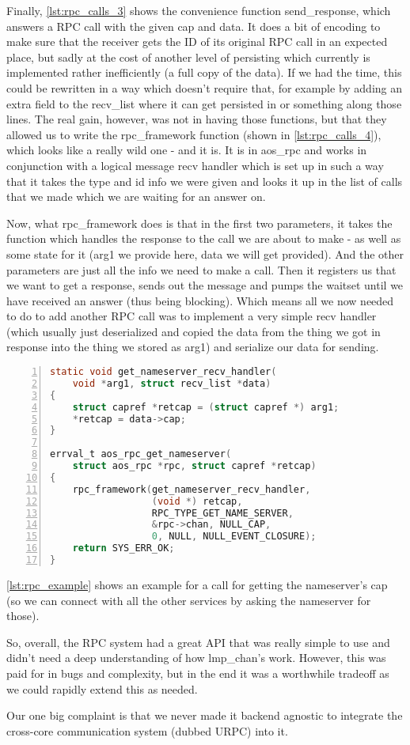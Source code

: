 Finally, \autoref{lst:rpc_calls_3} shows the convenience function 
send\_response, which answers a RPC call with the given cap and data. It does 
a bit of encoding to make sure that the receiver gets the ID of its original 
RPC call in an expected place, but sadly at the cost of another level of 
persisting which currently is implemented rather inefficiently (a full copy 
of the data). If we had the time, this could be rewritten in a way which 
doesn't require that, for example by adding an extra field to the recv\_list 
where it can get persisted in or something along those lines.
The real gain, however, was not in having those functions, but that they 
allowed us to write the rpc\_framework function (shown in 
\autoref{lst:rpc_calls_4}), which looks like a really wild one - and it is. 
It is in aos\_rpc and works in conjunction with a logical message recv handler 
which is set up in such a way that it takes the type and id info we were given 
and looks it up in the list of calls that we made which we are waiting for an 
answer on.
\medskip

Now, what rpc\_framework does is that in the first two parameters, it takes 
the function which handles the response to the call we are about to make - as 
well as some state for it (arg1 we provide here, data we will get provided). 
And the other parameters are just all the info we need to make a call.
Then it registers us that we want to get a response, sends out the message and 
pumps the waitset until we have received an answer (thus being blocking). 
Which means all we now needed to do to add another RPC call was to implement a 
very simple recv handler (which usually just deserialized and copied the data 
from the thing we got in response into the thing we stored as arg1) and 
serialize our data for sending.
\medskip

\begin{lstlisting}[caption={aos\_rpc\_get with helper function}, 
label=lst:rpc_example, numbers=left, stepnumber=1, float, floatplacement=tl, 
frame=tb, language=c]
static void get_nameserver_recv_handler(
    void *arg1, struct recv_list *data)
{
    struct capref *retcap = (struct capref *) arg1;
    *retcap = data->cap;
}

errval_t aos_rpc_get_nameserver(
    struct aos_rpc *rpc, struct capref *retcap)
{
    rpc_framework(get_nameserver_recv_handler,
                  (void *) retcap,
                  RPC_TYPE_GET_NAME_SERVER, 
                  &rpc->chan, NULL_CAP,
                  0, NULL, NULL_EVENT_CLOSURE);
    return SYS_ERR_OK;
}
\end{lstlisting}

\autoref{lst:rpc_example} shows an example for a call for getting the 
nameserver's cap (so we can connect with all the other services by asking the 
nameserver for those).
\medskip

So, overall, the RPC system had a great API that was really simple to use 
and didn't need a deep understanding of how lmp\_chan's work. However, this 
was paid for in bugs and complexity, but in the end it was a worthwhile 
tradeoff as we could rapidly extend this as needed.
\medskip

Our one big complaint is that we never made it backend agnostic to integrate 
the cross-core communication system (dubbed URPC) into it.
